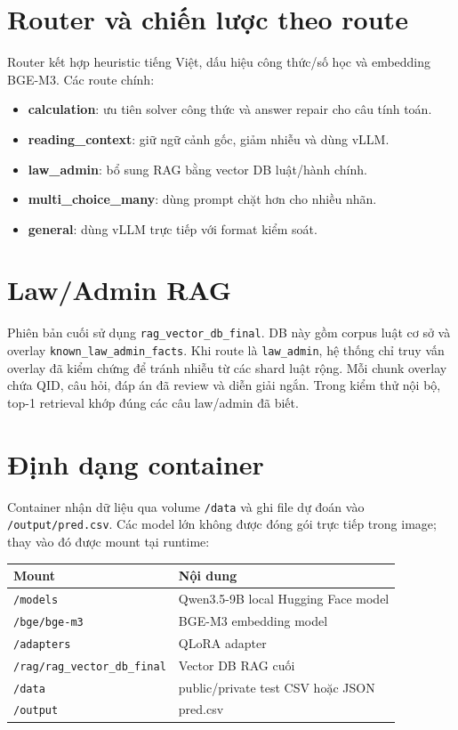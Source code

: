 \documentclass[12pt,a4paper]{article}
\begin{document}
\section{Router và chiến lược theo route}

Router kết hợp heuristic tiếng Việt, dấu hiệu công thức/số học và embedding
BGE-M3. Các route chính:

\begin{itemize}[leftmargin=*]
  \item \textbf{calculation}: ưu tiên solver công thức và answer repair cho câu
  tính toán.
  \item \textbf{reading\_context}: giữ ngữ cảnh gốc, giảm nhiễu và dùng vLLM.
  \item \textbf{law\_admin}: bổ sung RAG bằng vector DB luật/hành chính.
  \item \textbf{multi\_choice\_many}: dùng prompt chặt hơn cho nhiều nhãn.
  \item \textbf{general}: dùng vLLM trực tiếp với format kiểm soát.
\end{itemize}

\section{Law/Admin RAG}

Phiên bản cuối sử dụng \texttt{rag\_vector\_db\_final}. DB này gồm corpus luật
cơ sở và overlay \texttt{known\_law\_admin\_facts}. Khi route là
\texttt{law\_admin}, hệ thống chỉ truy vấn overlay đã kiểm chứng để tránh nhiễu
từ các shard luật rộng. Mỗi chunk overlay chứa QID, câu hỏi, đáp án đã review và
diễn giải ngắn. Trong kiểm thử nội bộ, top-1 retrieval khớp đúng các câu
law/admin đã biết.

\section{Định dạng container}

Container nhận dữ liệu qua volume \texttt{/data} và ghi file dự đoán vào
\texttt{/output/pred.csv}. Các model lớn không được đóng gói trực tiếp trong
image; thay vào đó được mount tại runtime:

\begin{center}
\begin{tabular}{ll}
\toprule
Mount & Nội dung \\
\midrule
\texttt{/models} & Qwen3.5-9B local Hugging Face model \\
\texttt{/bge/bge-m3} & BGE-M3 embedding model \\
\texttt{/adapters} & QLoRA adapter \\
\texttt{/rag/rag\_vector\_db\_final} & Vector DB RAG cuối \\
\texttt{/data} & public/private test CSV hoặc JSON \\
\texttt{/output} & pred.csv \\
\bottomrule
\end{tabular}
\end{center}
\end{document}
